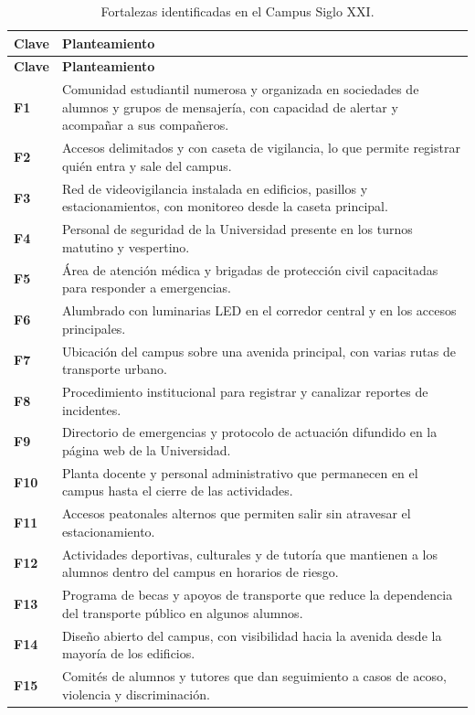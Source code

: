 \documentclass[11pt,a4paper]{article}
\newcommand{\clave}[1]{\textbf{\color{uazblue}#1}}
\begin{document}
{\small\singlespacing
\begin{longtable}{@{}L{1.25cm}L{13.9cm}@{}}
\caption{Fortalezas identificadas en el Campus Siglo XXI.}
\label{tab:fortalezas}\\
\toprule
\textbf{Clave} & \textbf{Planteamiento} \\
\midrule
\endfirsthead
\toprule
\textbf{Clave} & \textbf{Planteamiento} \\
\midrule
\endhead
\bottomrule
\endfoot
\bottomrule
\endlastfoot
\clave{F1}  & Comunidad estudiantil numerosa y organizada en sociedades de alumnos y grupos de mensajería, con capacidad de alertar y acompañar a sus compañeros. \\
\clave{F2}  & Accesos delimitados y con caseta de vigilancia, lo que permite registrar quién entra y sale del campus. \\
\clave{F3}  & Red de videovigilancia instalada en edificios, pasillos y estacionamientos, con monitoreo desde la caseta principal. \\
\clave{F4}  & Personal de seguridad de la Universidad presente en los turnos matutino y vespertino. \\
\clave{F5}  & Área de atención médica y brigadas de protección civil capacitadas para responder a emergencias. \\
\clave{F6}  & Alumbrado con luminarias LED en el corredor central y en los accesos principales. \\
\clave{F7}  & Ubicación del campus sobre una avenida principal, con varias rutas de transporte urbano. \\
\clave{F8}  & Procedimiento institucional para registrar y canalizar reportes de incidentes. \\
\clave{F9}  & Directorio de emergencias y protocolo de actuación difundido en la página web de la Universidad. \\
\clave{F10} & Planta docente y personal administrativo que permanecen en el campus hasta el cierre de las actividades. \\
\clave{F11} & Accesos peatonales alternos que permiten salir sin atravesar el estacionamiento. \\
\clave{F12} & Actividades deportivas, culturales y de tutoría que mantienen a los alumnos dentro del campus en horarios de riesgo. \\
\clave{F13} & Programa de becas y apoyos de transporte que reduce la dependencia del transporte público en algunos alumnos. \\
\clave{F14} & Diseño abierto del campus, con visibilidad hacia la avenida desde la mayoría de los edificios. \\
\clave{F15} & Comités de alumnos y tutores que dan seguimiento a casos de acoso, violencia y discriminación. \\
\end{longtable}}
\end{document}

